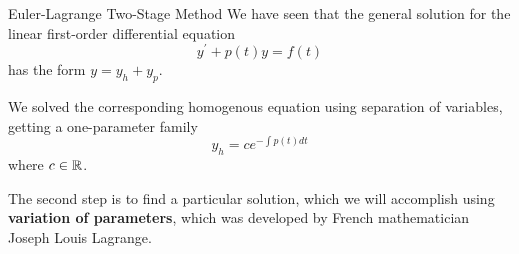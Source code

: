 \documentclass{beamer}
\begin{document}
\begin{frame}
\begin{block}{Euler-Lagrange Two-Stage Method}
We have seen that the general solution for the linear first-order differential equation
\begin{equation*}
y^\prime+p(t) y = f(t)
\end{equation*}
has the form $y=y_h+y_p$.\pause

\vspace{2mm}
We solved the corresponding homogenous equation using separation of variables, getting a one-parameter family
\begin{equation*}
y_h=c e^{-\int p(t) dt}
\end{equation*}
where $c\in\mathbb{R}$.\pause

\vspace{2mm}
The second step is to find a particular solution, which we will accomplish using \textbf{variation of parameters}, which was developed by French mathematician Joseph Louis Lagrange.
\end{block}
\end{frame}
\end{document}
